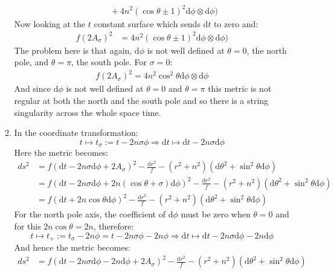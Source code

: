 \documentclass[12pt,a4]{article}
\newcommand{\e}{\mathrm{d}}
\begin{document}
\begin{enumerate}
\begin{enumerate}
\begin{align*}
                                 &\qquad + 4 n^2 (\cos\theta \pm 1)^2 \e \phi \otimes \e \phi)
        \end{align*}
        Now looking at the $t$  constant surface which sends $\e t$ to zero and:
        \begin{align*}
          f(2 A_\sigma)^2 &= 4 n^2 (\cos\theta \pm 1)^2 \e \phi \otimes \e \phi)
        \end{align*}
        The problem here is that again, $\e \phi$ is not well defined at $\theta = 0$, the north pole, and $\theta = \pi$, the south pole.
        For $\sigma = 0$:
        \begin{align*}
          f(2 A_\sigma)^2 = 4 n^2 \cos^2\theta  \e \phi \otimes \e \phi
        \end{align*}
        And since $\e \phi$ is not well defined at $\theta = 0$ and $\theta = \pi$ this metric is not regular at both the north and the south pole and so there is a string singularity across the whole space time.
      \item
        In the coordinate transformation:
        \begin{equation*}
          t \mapsto t_\sigma := t - 2 n \sigma \phi \Rightarrow \e t \mapsto \e t - 2 n \sigma \e \phi
        \end{equation*}
        Here the metric becomes:
        \begin{align*}
          ds^2 &= f(\e t - 2 n \sigma \e \phi + 2 A_\sigma)^2 - \frac{\e r^2}{f} - (r^2 + n^2)(\e \theta^2 + \sin^2 \theta \e \phi)\\
               &= f(\e t - 2 n \sigma \e \phi + 2n (\cos \theta + \sigma) \e \phi)^2 - \frac{\e r^2}{f} - (r^2 + n^2)(\e \theta^2 + \sin^2 \theta \e \phi)\\
               &= f(\e t  + 2n \cos \theta  \e \phi)^2 - \frac{\e r^2}{f} - (r^2 + n^2)(\e \theta^2 + \sin^2 \theta \e \phi)
        \end{align*}
        For the north pole axis, the coefficient of $\e \phi$ must be zero when $\theta = 0$ and for this $2n \cos \theta = 2n$, therefore:
        \begin{equation*}
          t \mapsto t_+ := t_\sigma - 2n \phi = t - 2 n \sigma \phi - 2n \phi \Rightarrow \e t \mapsto \e t - 2 n \sigma \e \phi - 2 n \e \phi
        \end{equation*}
        And hence the metric becomes:
        \begin{align*}
          ds^2 &= f(\e t - 2 n \sigma \e \phi - 2 n \e \phi + 2 A_\sigma)^2 - \frac{\e r^2}{f} - (r^2 + n^2)(\e \theta^2 + \sin^2 \theta \e \phi)\\

\end{align*}
\end{enumerate}
\end{enumerate}
\end{document}

